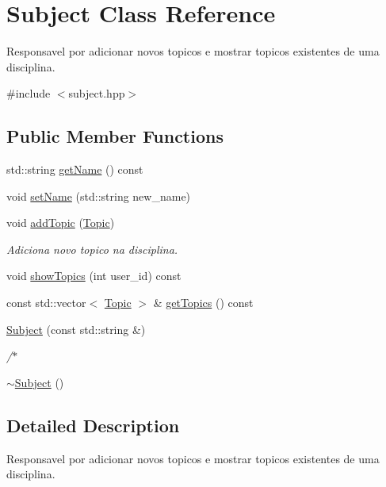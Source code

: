 \hypertarget{class_subject}{}\section{Subject Class Reference}
\label{class_subject}


Responsavel por adicionar novos topicos e mostrar topicos existentes de uma disciplina.  




{\ttfamily \#include $<$subject.\+hpp$>$}

\subsection*{Public Member Functions}
\begin{DoxyCompactItemize}
\item 
std\+::string \hyperlink{class_subject_ad81aadc033a880e7cde2c10daf34ea2f}{get\+Name} () const
\item 
void \hyperlink{class_subject_a9d3ec013f7c71f428f1118257785f890}{set\+Name} (std\+::string new\+\_\+name)
\item 
void \hyperlink{class_subject_a784773913acee5fdef548bc9cd7e8aca}{add\+Topic} (\hyperlink{class_topic}{Topic})
\begin{DoxyCompactList}\small\item\em Adiciona novo topico na disciplina. \end{DoxyCompactList}\item 
void \hyperlink{class_subject_ab9f2b4494496feb662d69aac64e5e61c}{show\+Topics} (int user\+\_\+id) const
\item 
const std\+::vector$<$ \hyperlink{class_topic}{Topic} $>$ \& \hyperlink{class_subject_ab50189ef9c4edf65cf9218f5d956bf4b}{get\+Topics} () const
\item 
\hyperlink{class_subject_aadd211855155af3c49b6907520d77675}{Subject} (const std\+::string \&)
\begin{DoxyCompactList}\small\item\em /$\ast$ \end{DoxyCompactList}\item 
\hyperlink{class_subject_a7c4f522850f718466e5be7eb55ba1969}{$\sim$\+Subject} ()
\end{DoxyCompactItemize}


\subsection{Detailed Description}
Responsavel por adicionar novos topicos e mostrar topicos existentes de uma disciplina. 

